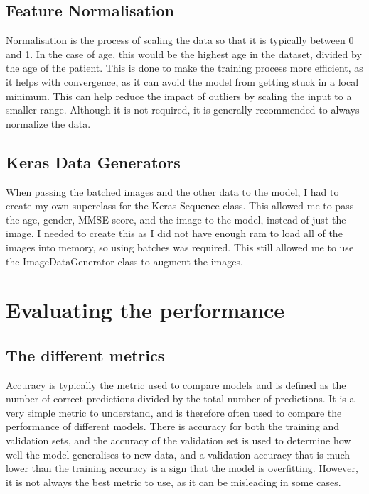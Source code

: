 \documentclass[]{final_report}
\begin{document}
\section{Feature Normalisation}

Normalisation is the process of scaling the data so that it is typically between 0 and 1.
In the case of age, this would be the highest age in the dataset, divided by the age of the patient.
This is done to make the training process more efficient, as it helps with convergence, as it can avoid the model from getting stuck in a local minimum. This can help reduce the impact of outliers by scaling the input to a smaller range.
Although it is not required, it is generally recommended to always normalize the data.

\section{Keras Data Generators}

When passing the batched images and the other data to the model, I had to create my own superclass for the Keras Sequence class. This allowed me to pass the age, gender, MMSE score, and the image to the model, instead of just the image. I needed to create this as I did not have enough ram to load all of the images into memory, so using batches was required. This still allowed me to use the ImageDataGenerator class to augment the images.

\chapter{Evaluating the performance}

\section{The different metrics}
Accuracy is typically the metric used to compare models and is defined as the number of correct predictions divided by the total number of predictions.
It is a very simple metric to understand, and is therefore often used to compare the performance of different models.
There is accuracy for both the training and validation sets, and the accuracy of the validation set is used to determine how well the model generalises to new data,
and a validation accuracy that is much lower than the training accuracy is a sign that the model is overfitting.
However, it is not always the best metric to use, as it can be misleading in some cases.
\end{document}

